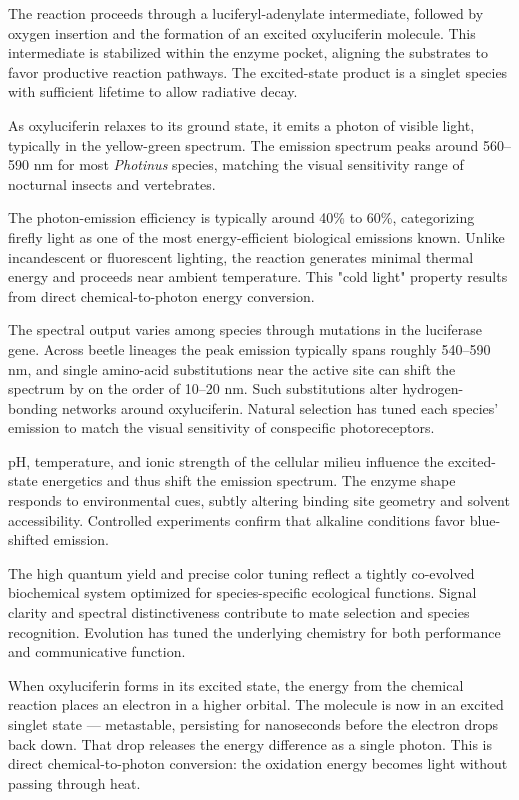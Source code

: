 The reaction proceeds through a luciferyl-adenylate intermediate, followed by oxygen insertion and the formation of an excited oxyluciferin molecule. This intermediate is stabilized within the enzyme pocket, aligning the substrates to favor productive reaction pathways. The excited-state product is a singlet species with sufficient lifetime to allow radiative decay.

As oxyluciferin relaxes to its ground state, it emits a photon of visible light, typically in the yellow-green spectrum. The emission spectrum peaks around 560–590 nm for most \emph{Photinus} species, matching the visual sensitivity range of nocturnal insects and vertebrates.

The photon-emission efficiency is typically around 40\% to 60\%, categorizing firefly light as one of the most energy-efficient biological emissions known. Unlike incandescent or fluorescent lighting, the reaction generates minimal thermal energy and proceeds near ambient temperature. This "cold light" property results from direct chemical-to-photon energy conversion.

The spectral output varies among species through mutations in the luciferase gene. Across beetle lineages the peak emission typically spans roughly 540–590 nm, and single amino-acid substitutions near the active site can shift the spectrum by on the order of 10–20 nm. Such substitutions alter hydrogen-bonding networks around oxyluciferin. Natural selection has tuned each species' emission to match the visual sensitivity of conspecific photoreceptors.

pH, temperature, and ionic strength of the cellular milieu influence the excited-state energetics and thus shift the emission spectrum. The enzyme shape responds to environmental cues, subtly altering binding site geometry and solvent accessibility. Controlled experiments confirm that alkaline conditions favor blue-shifted emission.

The high quantum yield and precise color tuning reflect a tightly co-evolved biochemical system optimized for species-specific ecological functions. Signal clarity and spectral distinctiveness contribute to mate selection and species recognition. Evolution has tuned the underlying chemistry for both performance and communicative function.

When oxyluciferin forms in its excited state, the energy from the chemical reaction places an electron in a higher orbital. The molecule is now in an excited singlet state — metastable, persisting for nanoseconds before the electron drops back down. That drop releases the energy difference as a single photon. This is direct chemical-to-photon conversion: the oxidation energy becomes light without passing through heat.

